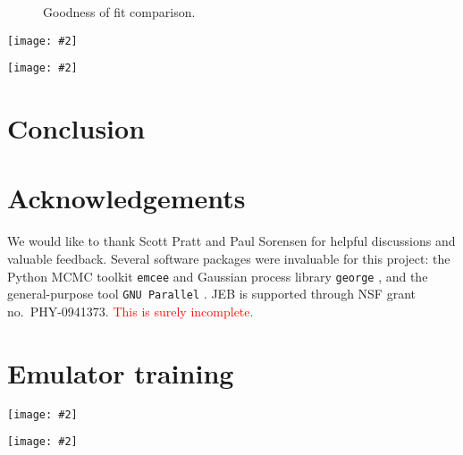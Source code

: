 \documentclass[aps,prc,reprint,amsmath]{revtex4-1}
\newcommand{\todo}[1]{\textcolor{red}{#1}}
\newcommand{\widefig}[3][t]{
  \begin{figure*}[#1]
    \texttt{[image: \#2]}
    \caption{\label{fig:#2}#3}
  \end{figure*}
}
\newcommand{\placeholderfig}[3][t]{
  \begin{figure}[#1]
    \centering
    \framebox{\parbox[c][.5\columnwidth]{\columnwidth}{
      placeholder
    }}
    \caption{\label{fig:#2}#3}
  \end{figure}
}
\begin{document}
\placeholderfig{chi_squared}{
  Goodness of fit comparison.
}

\widefig{posterior_draws_glb}{
  Random realizations of the calibrated posterior for the Glauber model.
  Similar to FIG.~\ref{fig:prior_draws_glb},
  except the lines are posterior emulator predictions instead of explicit prior calculations.
  The red line is the maximum a posteriori point of the MCMC chain.
}

\widefig{posterior_draws_kln}{
  Same as FIG.~\ref{fig:posterior_draws_glb} for the KLN model.
}



\section{Conclusion}


\section*{Acknowledgements}

We would like to thank Scott Pratt and Paul Sorensen for helpful discussions and valuable feedback.
Several software packages were invaluable for this project:
the Python MCMC toolkit \texttt{emcee} \cite{FM:2013mc} and Gaussian process library \texttt{george} \cite{Ambikasaran:2014gp}, and the general-purpose tool \texttt{GNU Parallel} \cite{Tange:2011pa}.
JEB is supported through NSF grant no.~PHY-0941373.
\todo{This is surely incomplete.}


\appendix

\section{\label{app:train}Emulator training}

\widefig{training_posterior_glb}{
  Posterior distributions of the principal component Gaussian process hyperparameters for the Glauber model.
  The notation $\ell\;x$ means the squared-exponential correlation length for parameter $x$.
}

\widefig{training_posterior_kln}{
  Same as FIG.~\ref{fig:training_posterior_glb} for the KLN model.
}




\end{document}
